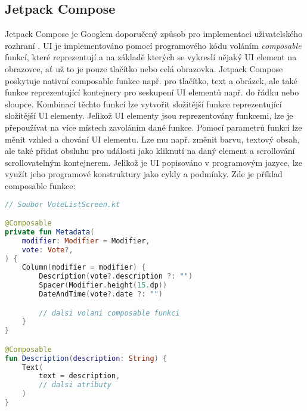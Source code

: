 \subsection*{Jetpack Compose}
\label{ssec:jetpack-compose}
Jetpack Compose je Googlem doporučený způsob pro implementaci uživatelského rozhraní \cite{jetpack-compose}. UI je implementováno pomocí programového kódu voláním \textit{composable} funkcí, které reprezentují a na základě kterých se vykreslí nějaký UI element na obrazovce, ať už to je pouze tlačítko nebo celá obrazovka. Jetpack Compose poskytuje nativní composable funkce např. pro tlačítko, text a obrázek, ale také funkce reprezentující kontejnery pro seskupení UI elementů např. do řádku nebo sloupce. Kombinací těchto funkcí lze vytvořit složitější funkce reprezentující složitější UI elementy. Jelikož UI elementy jsou reprezentovány funkcemi, lze je přepoužívat na více místech zavoláním dané funkce. Pomocí parametrů funkcí lze měnit vzhled a chování UI elementu. Lze mu např. změnit barvu, textový obsah, ale také přidat obsluhu pro události jako kliknutí na daný element a scrollování scrollovatelným kontejnerem. Jelikož je UI popisováno v programovým jazyce, lze využít jeho programové konstruktury jako cykly a podmínky. Zde je příklad composable funkce:

\begin{lstlisting}[caption={Ukázka composable funkce}, label={lst:composable-example}, tabsize=2, language=Kotlin]
// Soubor VoteListScreen.kt

@Composable
private fun Metadata(
	modifier: Modifier = Modifier,
	vote: Vote?,
) {
	Column(modifier = modifier) {
		Description(vote?.description ?: "")
		Spacer(Modifier.height(15.dp))
		DateAndTime(vote?.date ?: "")

		// dalsi volani composable funkci
	}
}

@Composable
fun Description(description: String) {
	Text(
		text = description,
		// dalsi atributy
	)
}

\end{lstlisting}

